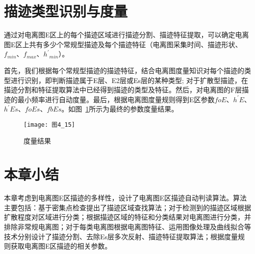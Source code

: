 \section{描迹类型识别与度量}
\label{4_6}

通过对电离图E区上的每个描迹区域进行描迹分割、描迹特征提取，可以确定电离图E区上共有多少个常规型描迹及每个描迹特征（电离图采集时间、描迹形状、$f_{min}$、$f_{max}$、${h^{'}}_{min}$）。

首先，我们根据每个常规型描迹的描迹特征，结合电离图度量知识对每个描迹的类型进行识别，即判断描迹属于E层、E2层或Es层的某种类型; 对于扩散型描迹，在描迹分割和特征提取算法中已经得到描迹的类型及特征。然后，对电离图的F层描迹的最小频率进行自动度量。最后，根据电离图度量规则得到E区参数$foE$、$h^{'}E$、$h^{'}Es$、$foEs$、$fbEs$。如图~\ref{图4_15}所示为最终的参数度量结果。

\begin{figure}[!ht]
\centering
\texttt{[image: 图4\_15]}
\caption{度量结果}
\label{图4_15}
\end{figure}
      

\section{本章小结}
\label{4_7}

本章考虑到电离图E区描迹的多样性，设计了电离图E区描迹自动判读算法。算法主要包括：基于密集点检查提出了描迹区域查找算法；对于检测到的描迹区域根据扩散程度对区域进行分类；根据描迹区域的特征和分类结果对电离图进行分类，并排除非常规电离图；对于每类电离图根据电离图特征、运用图像处理及曲线拟合等技术分别设计了描迹分割、去除Es层多次反射、描迹特征提取算法；根据度量规则获取电离图E区描迹的相关参数。


















